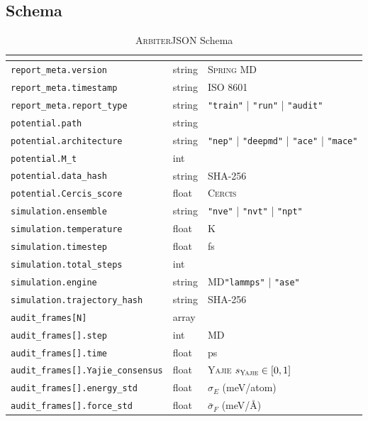 \documentclass[12pt,a4paper]{article}
\theoremstyle{remark}
\newcommand{\Yajie}{\textsc{Yajie}}
\newcommand{\Cercis}{\textsc{Cercis}}
\newcommand{\Arbiter}{\textsc{Arbiter}}
\newcommand{\SpringMD}{\textsc{Spring MD}}
\begin{document}
\subsection{Schema}

\begin{table}[H]
\centering
\caption{\Arbiter{}JSON Schema}
\label{tab:arbiter_schema}
\renewcommand{\arraystretch}{1.3}
\scriptsize
\begin{tabular}{@{}p{3.2cm} p{2.0cm} p{8.8cm}@{}}
\toprule
\textbf{} & \textbf{} & \textbf{} \\
\midrule
\texttt{report\_meta.version} & string & \SpringMD{} \\
\texttt{report\_meta.timestamp} & string & ISO 8601 \\
\texttt{report\_meta.report\_type} & string & \texttt{"train"} | \texttt{"run"} | \texttt{"audit"} \\
\midrule
\texttt{potential.path} & string &  \\
\texttt{potential.architecture} & string & \texttt{"nep"} | \texttt{"deepmd"} | \texttt{"ace"} | \texttt{"mace"} \\
\texttt{potential.M\_t} & int &  \\
\texttt{potential.data\_hash} & string & SHA-256 \\
\texttt{potential.Cercis\_score} & float & \Cercis{} \\
\midrule
\texttt{simulation.ensemble} & string & \texttt{"nve"} | \texttt{"nvt"} | \texttt{"npt"} \\
\texttt{simulation.temperature} & float & K \\
\texttt{simulation.timestep} & float & fs\\
\texttt{simulation.total\_steps} & int &  \\
\texttt{simulation.engine} & string & MD\texttt{"lammps"} | \texttt{"ase"} \\
\texttt{simulation.trajectory\_hash} & string & SHA-256 \\
\midrule
\texttt{audit\_frames[N]} & array &  \\
\texttt{audit\_frames[].step} & int & MD \\
\texttt{audit\_frames[].time} & float & ps \\
\texttt{audit\_frames[].Yajie\_consensus} & float & \Yajie{} $s_{\Yajie} \in [0,1]$ \\
\texttt{audit\_frames[].energy\_std} & float &  $\sigma_E$ (meV/atom) \\
\texttt{audit\_frames[].force\_std} & float &  $\bar{\sigma}_F$ (meV/Å) \\

\end{tabular}
\end{table}
\end{document}
